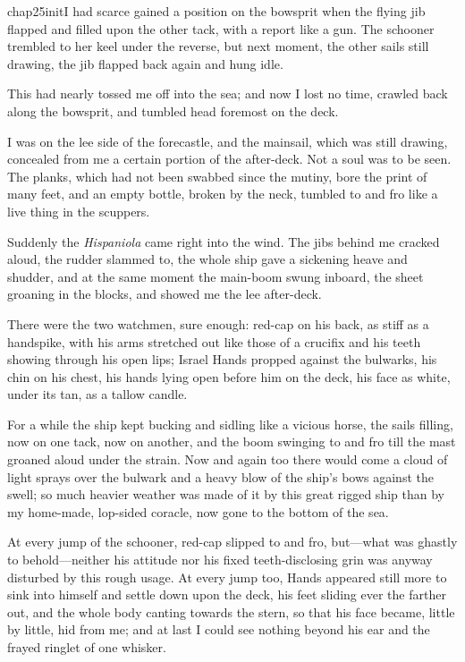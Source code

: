 
\lettrine{chap25initI}{} had scarce gained a position on the bowsprit when the flying jib flapped and filled upon the other tack, with a report like a gun. The schooner trembled to her keel under the reverse, but next moment, the other sails still drawing, the jib flapped back again and hung idle.

This had nearly tossed me off into the sea; and now I lost no time, crawled back along the bowsprit, and tumbled head foremost on the deck.

I was on the lee side of the forecastle, and the mainsail, which was still drawing, concealed from me a certain portion of the after-deck. Not a soul was to be seen. The planks, which had not been swabbed since the mutiny, bore the print of many feet, and an empty bottle, broken by the neck, tumbled to and fro like a live thing in the scuppers.

Suddenly the \textit{Hispaniola} came right into the wind. The jibs behind me cracked aloud, the rudder slammed to, the whole ship gave a sickening heave and shudder, and at the same moment the main-boom swung inboard, the sheet groaning in the blocks, and showed me the lee after-deck.

There were the two watchmen, sure enough: red-cap on his back, as stiff as a handspike, with his arms stretched out like those of a crucifix and his teeth showing through his open lips; Israel Hands propped against the bulwarks, his chin on his chest, his hands lying open before him on the deck, his face as white, under its tan, as a tallow candle.

For a while the ship kept bucking and sidling like a vicious horse, the sails filling, now on one tack, now on another, and the boom swinging to and fro till the mast groaned aloud under the strain. Now and again too there would come a cloud of light sprays over the bulwark and a heavy blow of the ship's bows against the swell; so much heavier weather was made of it by this great rigged ship than by my home-made, lop-sided coracle, now gone to the bottom of the sea.

At every jump of the schooner, red-cap slipped to and fro, but—what was ghastly to behold—neither his attitude nor his fixed teeth-disclosing grin was anyway disturbed by this rough usage. At every jump too, Hands appeared still more to sink into himself and settle down upon the deck, his feet sliding ever the farther out, and the whole body canting towards the stern, so that his face became, little by little, hid from me; and at last I could see nothing beyond his ear and the frayed ringlet of one whisker.

